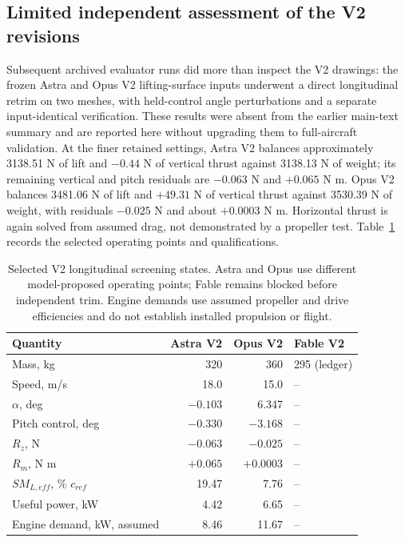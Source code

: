 \documentclass[10pt,letterpaper]{article}
\begin{document}
\subsection{Limited independent assessment of the V2 revisions}
Subsequent archived evaluator runs did more than inspect the V2 drawings: the frozen Astra and Opus V2 lifting-surface inputs underwent a direct longitudinal retrim on two meshes, with held-control angle perturbations and a separate input-identical verification. These results were absent from the earlier main-text summary and are reported here without upgrading them to full-aircraft validation. At the finer retained settings, Astra V2 balances approximately 3138.51 N of lift and $-0.44$ N of vertical thrust against 3138.13 N of weight; its remaining vertical and pitch residuals are $-0.063$ N and $+0.065$ N m. Opus V2 balances 3481.06 N of lift and $+49.31$ N of vertical thrust against 3530.39 N of weight, with residuals $-0.025$ N and about $+0.0003$ N m. Horizontal thrust is again solved from assumed drag, not demonstrated by a propeller test. Table~\ref{tab:v2} records the selected operating points and qualifications.

\begin{table}[H]\centering\small
\caption{Selected V2 longitudinal screening states. Astra and Opus use different model-proposed operating points; Fable remains blocked before independent trim. Engine demands use assumed propeller and drive efficiencies and do not establish installed propulsion or flight.}\label{tab:v2}
\begin{tabular}{lrrl}\toprule
Quantity & Astra V2 & Opus V2 & Fable V2\\\midrule
Mass, kg & 320 & 360 & 295 (ledger)\\
Speed, m/s & 18.0 & 15.0 & --\\
$\alpha$, deg & $-0.103$ & 6.347 & --\\
Pitch control, deg & $-0.330$ & $-3.168$ & --\\
$R_z$, N & $-0.063$ & $-0.025$ & --\\
$R_m$, N m & $+0.065$ & $+0.0003$ & --\\
$SM_{L,eff}$, \% $c_{ref}$ & 19.47 & 7.76 & --\\
Useful power, kW & 4.42 & 6.65 & --\\
Engine demand, kW, assumed & 8.46 & 11.67 & --\\\bottomrule
\end{tabular}
\end{table}
\end{document}
